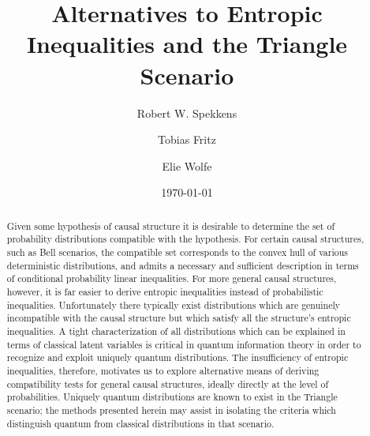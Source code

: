 



\title{Alternatives to Entropic Inequalities and the Triangle Scenario}
\author{Robert W. Spekkens}
\author{Tobias Fritz}
\author{Elie Wolfe}
\date{\today}


\begin{abstract}
Given some hypothesis of causal structure it is desirable to determine the set of probability distributions compatible with the hypothesis. For certain causal structures, such as Bell scenarios, the compatible set corresponds to the convex hull of various deterministic distributions, and admits a necessary and sufficient description in terms of conditional probability linear inequalities. For more general causal structures, however, it is far easier to derive entropic inequalities instead of probabilistic inequalities. Unfortunately there typically exist distributions which are genuinely incompatible with the causal structure but which satisfy all the structure's entropic inequalities. A tight characterization of all distributions which can be explained in terms of classical latent variables is critical in quantum information theory in order to recognize and exploit uniquely quantum distributions. The insufficiency of entropic inequalities, therefore, motivates us to explore alternative means of deriving compatibility tests for general causal structures, ideally directly at the level of probabilities. Uniquely quantum distributions are known to exist in the Triangle scenario; the methods presented herein may assist in isolating the criteria which distinguish quantum from classical distributions in that scenario.
\end{abstract}
\maketitle


